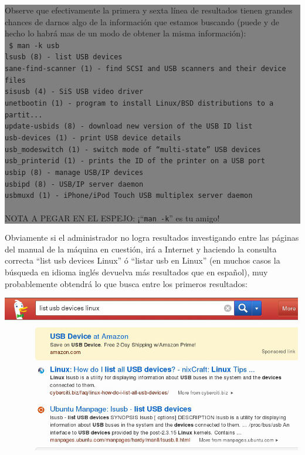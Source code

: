 \documentclass[12pt]{article}
\begin{document}
\colorbox{grey}{\parbox[t]{0.95\linewidth}{ \vspace*{0.5cm} { 
Observe que efectivamente la primera y sexta línea de resultados tienen grandes chances 
de darnos algo de la información que estamos buscando (puede y de hecho lo habrá mas de un 
modo de obtener la misma información): \\ 
{\tt 
\$ man -k usb \\
lsusb (8)            - list USB devices\\
sane-find-scanner (1) - find SCSI and USB scanners and their device files\\
sisusb (4)           - SiS USB video driver\\
unetbootin (1)       - program to install Linux/BSD distributions to a partit...\\
update-usbids (8)    - download new version of the USB ID list\\
usb-devices (1)      - print USB device details\\
usb\_modeswitch (1)   - switch mode of ``multi-state'' USB devices\\
usb\_printerid (1)    - prints the ID of the printer on a USB port\\
usbip (8)            - manage USB/IP devices\\
usbipd (8)           - USB/IP server daemon\\
usbmuxd (1)          - iPhone/iPod Touch USB multiplex server daemon\\ \\
}
NOTA A PEGAR EN EL ESPEJO: ¡``{\tt man -k}'' es tu amigo!
} \vspace*{0.5cm} } } 

Obviamente si el administrador no logra resultados investigando entre las 
páginas del manual de la máquina en cuestión, irá a Internet y haciendo la consulta
correcta ``list usb devices Linux'' ó ``listar usb en Linux'' (en 
muchos casos la búsqueda en idioma inglés devuelva más resultados que en español),  
muy probablemente obtendrá lo que busca entre los primeros resultados: 

\begin{center}
 \includegraphics{lsusb.jpg}
\end{center}
\end{document}
